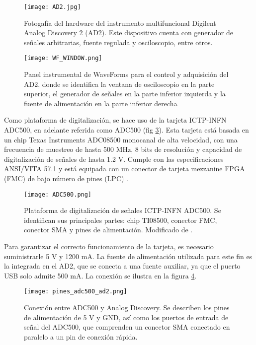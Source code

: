 \documentclass{report}
\begin{document}
\begin{figure}[H]
    \centering
    \texttt{[image: AD2.jpg]}
    \caption{Fotogafía del hardware del instrumento multifuncional Digilent Analog Discovery 2 (AD2). Este dispositivo cuenta con generador de señales arbitrarias, fuente regulada y osciloscopio, entre otros.}
    \label{fig:AD2}
\end{figure}

\begin{figure}[H]
    \centering
    \texttt{[image: WF\_WINDOW.png]}
    \caption{Panel instrumental de WaveForms para el control y adquisición del AD2, donde se identifica la ventana de osciloscopio en la parte superior, el generador de señales en la parte inferior izquierda y la fuente de alimentación en la parte inferior derecha}
    \label{fig:wf_setup}
\end{figure}

\noindent Como plataforma de digitalización, se hace uso de la tarjeta ICTP-INFN ADC500, en adelante referida como ADC500 (fig \ref{fig:adc500}). Esta tarjeta está basada en un chip Texas Instruments ADC08500 \cite{ti_adc08500} monocanal de alta velocidad, con una frecuencia de muestreo de hasta 500 MHz, 8 bits de resolución y capacidad de digitalización de señales de hasta 1.2 V. Cumple con las especificaciones ANSI/VITA 57.1 y está equipada con un conector de tarjeta mezzanine FPGA (FMC) de bajo número de pines (LPC) \cite{crespo2021remote}.\\

\begin{figure}[H]
    \centering
    \texttt{[image: ADC500.png]}
    \caption{Plataforma de digitalización de señales ICTP-INFN ADC500. Se identifican sus principales partes: chip TI08500, conector FMC, conector SMA y pines de alimentación. Modificado de \cite{ictp_smr3765}.}
    \label{fig:adc500}
\end{figure}

\noindent
Para garantizar el correcto funcionamiento de la tarjeta, es necesario suministrarle 5 V y 1200 mA. La fuente de alimentación utilizada para este fin es la integrada en el AD2, que se conecta a una fuente auxiliar, ya que el puerto USB solo admite 500 mA. La conexión se ilustra en la figura \ref{fig:adc500_ad2}.

\begin{figure}[H]
    \centering
    \texttt{[image: pines\_adc500\_ad2.png]}
    \caption{Conexión entre ADC500 y Analog Discovery. Se describen los pines de alimentación de 5 V y GND, así como los puertos de entrada de señal del ADC500, que comprenden un conector SMA conectado en paralelo a un pin de conexión rápida.}
    \label{fig:adc500_ad2}
\end{figure}
\end{document}
